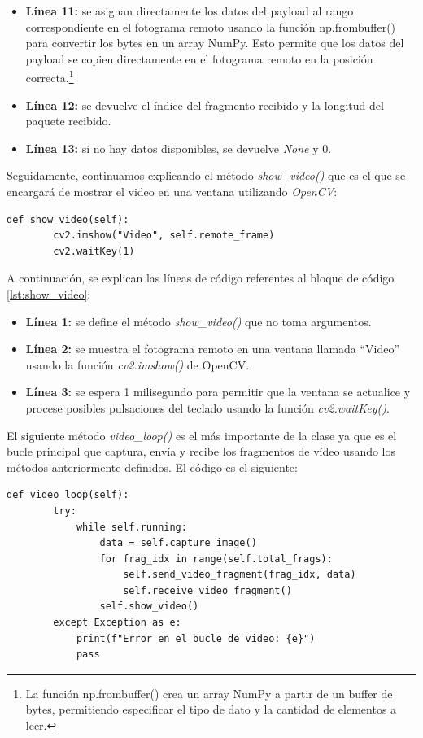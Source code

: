 \begin{itemize}
    \item \textbf{Línea 11:} se asignan directamente los datos del payload al rango correspondiente en el fotograma remoto usando la función np.frombuffer() para convertir los bytes en un array NumPy. Esto permite que los datos del payload se copien directamente en el fotograma remoto en la posición correcta.\footnote{La función np.frombuffer() crea un array NumPy a partir de un buffer de bytes, permitiendo especificar el tipo de dato y la cantidad de elementos a leer.}
    \item \textbf{Línea 12:} se devuelve el índice del fragmento recibido y la longitud del paquete recibido.
    \item \textbf{Línea 13:} si no hay datos disponibles, se devuelve \textit{None} y 0.
\end{itemize}
\vspace{\baselineskip}

Seguidamente, continuamos explicando el método \textit{show\_video()} que es el que se encargará de mostrar el video en una ventana utilizando \textit{OpenCV}:
\begin{lstlisting}[style=pythonstyle, caption={Método show\_video() de \textit{Minimal\_Video}}, label={lst:show_video}]
    def show_video(self):
        cv2.imshow("Video", self.remote_frame)
        cv2.waitKey(1)
\end{lstlisting}

A continuación, se explican las líneas de código referentes al bloque de código \ref{lst:show_video}:
\begin{itemize}
    \item \textbf{Línea 1:} se define el método \textit{show\_video()} que no toma argumentos.
    \item \textbf{Línea 2:} se muestra el fotograma remoto en una ventana llamada ``Video'' usando la función \textit{cv2.imshow()} de OpenCV.
    \item \textbf{Línea 3:} se espera 1 milisegundo para permitir que la ventana se actualice y procese posibles pulsaciones del teclado usando la función \textit{cv2.waitKey()}.
\end{itemize}
\vspace{\baselineskip}

El siguiente método \textit{video\_loop()} es el más importante de la clase ya que es el bucle principal que captura, envía y recibe los fragmentos de vídeo usando los métodos anteriormente definidos. El código es el siguiente:
\begin{lstlisting}[style=pythonstyle, caption={Método video\_loop() de \textit{Minimal\_Video}}, label={lst:video_loop_minimal_video}]
def video_loop(self):
        try:
            while self.running:
                data = self.capture_image()
                for frag_idx in range(self.total_frags):
                    self.send_video_fragment(frag_idx, data)
                    self.receive_video_fragment()
                self.show_video()
        except Exception as e:
            print(f"Error en el bucle de video: {e}")
            pass
\end{lstlisting}

